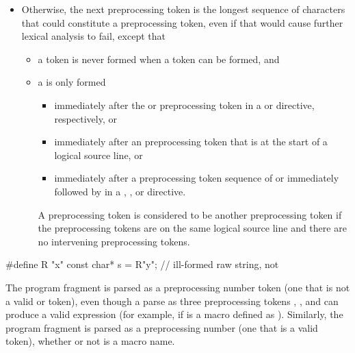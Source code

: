 \begin{itemize}
\item Otherwise,
the next preprocessing token is the longest sequence of
characters that could constitute a preprocessing token, even if that
would cause further lexical analysis to fail,
except that
\begin{itemize}
\item
a  token is never formed
when a  token can be formed, and
\item
a  is only formed
\begin{itemize}
\item
immediately after the  or  preprocessing token in a
 or 
directive, respectively, or
\item
immediately after an  preprocessing token that
is at the start of a logical source line, or
\item
immediately after a preprocessing token sequence of 
or  immediately followed by \tcode{(}
in a , , or  directive.
\end{itemize}
A preprocessing token is considered to be
another preprocessing token if
the preprocessing tokens are on the same logical source line and
there are no intervening preprocessing tokens.
\end{itemize}
\end{itemize}

\pnum
\begin{example}
\begin{codeblock}
#define R "x"
const char* s = R"y";           // ill-formed raw string, not 
\end{codeblock}
\end{example}

\pnum
\begin{example}
The program fragment  is parsed as a
preprocessing number token (one that is not a valid
 or  token),
even though a parse as three preprocessing tokens
, \tcode{+}, and  can produce a valid expression (for example,
if  is a macro defined as ). Similarly, the
program fragment  is parsed as a preprocessing number (one
that is a valid  token),
whether or not  is a macro name.
\end{example}

